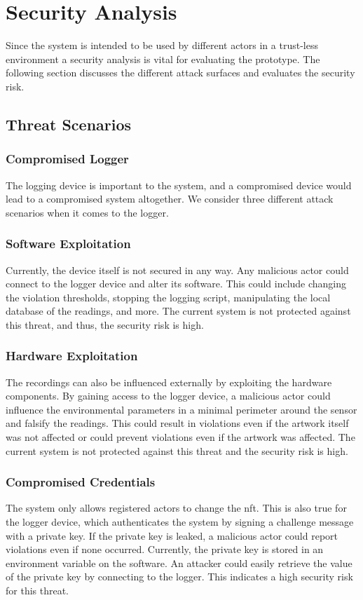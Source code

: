 \section{Security Analysis}
\label{sec:security_analysis}
Since the system is intended to be used by different actors in a trust-less environment a security analysis is vital for evaluating the prototype. The following section discusses the different attack surfaces and evaluates the security risk.

\subsection{Threat Scenarios}

\subsubsection{Compromised Logger}
The logging device is important to the system, and a compromised device would lead to a compromised system altogether. We consider three different attack scenarios when it comes to the logger.
\subsubsection{Software Exploitation}
Currently, the device itself is not secured in any way. Any malicious actor could connect to the logger device and alter its software. This could include changing the violation thresholds, stopping the logging script, manipulating the local database of the readings, and more. The current system is not protected against this threat, and thus, the security risk is high.
\subsubsection{Hardware Exploitation}
The recordings can also be influenced externally by exploiting the hardware components. By gaining access to the logger device, a malicious actor could influence the environmental parameters in a minimal perimeter around the sensor and falsify the readings. This could result in violations even if the artwork itself was not affected or could prevent violations even if the artwork was affected. The current system is not protected against this threat and the security risk is high.
\subsubsection{Compromised Credentials}
The system only allows registered actors to change the \gls{nft}. This is also true for the logger device, which authenticates the system by signing a challenge message with a private key. If the private key is leaked, a malicious actor could report violations even if none occurred. Currently, the private key is stored in an environment variable on the software. An attacker could easily retrieve the value of the private key by connecting to the logger. This indicates a high security risk for this threat.

